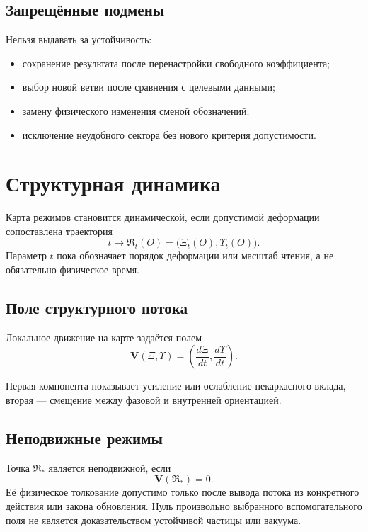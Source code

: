 \section{Запрещённые подмены}

Нельзя выдавать за устойчивость:
\begin{itemize}
 \item сохранение результата после перенастройки свободного коэффициента;
 \item выбор новой ветви после сравнения с целевыми данными;
 \item замену физического изменения сменой обозначений;
 \item исключение неудобного сектора без нового критерия допустимости.
\end{itemize}

\chapter{Структурная динамика}

Карта режимов становится динамической, если допустимой деформации сопоставлена
траектория
\begin{equation}
 t\longmapsto\mathfrak R_t(O)=
 \bigl(\Xi_t(O),\Upsilon_t(O)\bigr).
\end{equation}
Параметр $t$ пока обозначает порядок деформации или масштаб чтения, а не
обязательно физическое время.

\section{Поле структурного потока}

Локальное движение на карте задаётся полем
\begin{equation}
 \mathbf V(\Xi,\Upsilon)=
 \left(\frac{d\Xi}{dt},\frac{d\Upsilon}{dt}\right).
\end{equation}

Первая компонента показывает усиление или ослабление некаркасного вклада,
вторая --- смещение между фазовой и внутренней ориентацией.

\section{Неподвижные режимы}

Точка $\mathfrak R_*$ является неподвижной, если
\begin{equation}
 \mathbf V(\mathfrak R_*)=0.
\end{equation}
Её физическое толкование допустимо только после вывода потока из конкретного
действия или закона обновления. Нуль произвольно выбранного вспомогательного
поля не является доказательством устойчивой частицы или вакуума.

